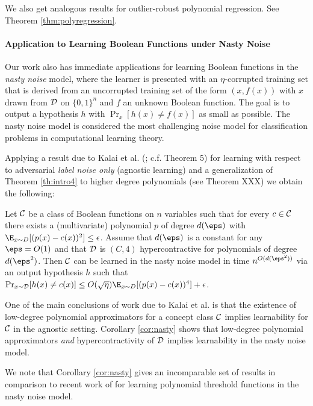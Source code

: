 We also get analogous results for outlier-robust polynomial regression. See Theorem \ref{thm:polyregression}.

 \paragraph{Application to Learning Boolean Functions under Nasty Noise}  Our work also has immediate applications for learning Boolean functions in the {\em nasty noise} model, where the learner is presented with an $\eta$-corrupted training set that is derived from an uncorrupted training set of the form $(x,f(x))$ with $x$ drawn from ${\cal D}$ on $\{0,1\}^n$ and $f$ an unknown Boolean function.  The goal is to output a hypothesis $h$ with $\Pr_{x}[h(x) \neq f(x)]$ as small as possible. The nasty noise model is considered the most challenging noise model for classification problems in computational learning theory. 

Applying a result due to Kalai et al. (\cite{KKMS}; c.f. Theorem 5) for learning with respect to adversarial {\em label noise only} (agnostic learning) and a generalization of Theorem \ref{th:intro4} to higher degree polynomials (see Theorem XXX) we obtain the following:

\begin{corollary} \label{cor:nasty}
Let ${\cal C}$ be a class of Boolean functions on $n$ variables such that for every $c \in {\cal C}$ there exists a (multivariate) polynomial $p$ of degree $d(\eps)$ with $\E_{x \sim D}[(p(x) - c(x))^2] \leq \epsilon$.  Assume that $d(\eps)$ is a constant for any $\eps = O(1)$ and that ${\cal D}$ is $(C,4)$ hypercontractive for polynomials of degree $d(\eps^2)$.  Then ${\cal C}$ can be learned in the nasty noise model in time $n^{O(d(\eps^2))}$ via an output hypothesis $h$ such that $\Pr_{x \sim {\cal D}}[h(x) \neq c(x)] \leq O(\sqrt{\eta}) \E_{x \sim D}[(p(x) - c(x))^4] + \epsilon$.  
\end{corollary}

One of the main conclusions of work due to Kalai et al. \cite{KKMS} is that the existence of low-degree polynomial approximators for a concept class ${\cal C}$ implies learnability for ${\cal C}$ in the agnostic setting.  Corollary \ref{cor:nasty} shows that low-degree polynomial approximators {\em and} hypercontractivity of ${\cal D}$ implies learnability in the nasty noise model. 

We note that Corollary \ref{cor:nasty} gives an incomparable set of results in comparison to recent work of \cite{nasty} for learning polynomial threshold functions in the nasty noise model.  %

